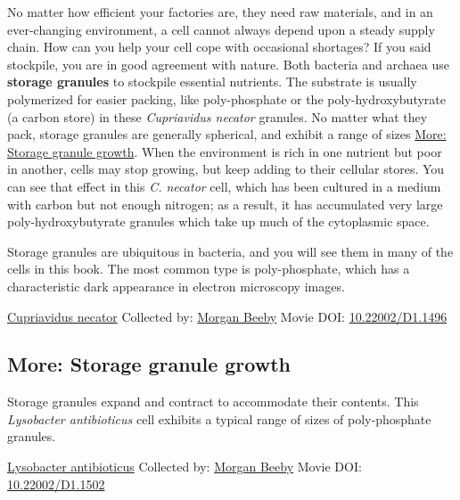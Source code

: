 \documentclass[]{tufte-book}
\begin{document}
No matter how efficient your factories are, they need raw materials, and in an ever-changing environment, a cell cannot always depend upon a steady supply chain. How can you help your cell cope with occasional shortages? If you said stockpile, you are in good agreement with nature. Both bacteria and archaea use \textbf{storage granules} to stockpile essential nutrients. The substrate is usually polymerized for easier packing, like poly-phosphate or the poly-hydroxybutyrate (a carbon store) in these \emph{Cupriavidus necator} granules. No matter what they pack, storage granules are generally spherical, and exhibit a range of sizes \protect\hyperlink{Storage_granule_growth}{More: Storage granule growth}. When the environment is rich in one nutrient but poor in another, cells may stop growing, but keep adding to their cellular stores. You can see that effect in this \emph{C. necator} cell, which has been cultured in a medium with carbon but not enough nitrogen; as a result, it has accumulated very large poly-hydroxybutyrate granules which take up much of the cytoplasmic space.

Storage granules are ubiquitous in bacteria, and you will see them in many of the cells in this book. The most common type is poly-phosphate, which has a characteristic dark appearance in electron microscopy images.



\hypertarget{htmlwidget-5c4355af012999587694}{}

\label{fig:4-8}\protect\hyperlink{tree}{Cupriavidus necator} Collected by: \protect\hyperlink{morgan_beeby}{Morgan Beeby} Movie DOI: \href{https://doi.org/10.22002/D1.1496}{10.22002/D1.1496}

\hypertarget{Storage_granule_growth}{%
\subsection*{More: Storage granule growth}\label{Storage_granule_growth}}

Storage granules expand and contract to accommodate their contents. This \emph{Lysobacter antibioticus} cell exhibits a typical range of sizes of poly-phosphate granules.



\hypertarget{htmlwidget-f50524f0ec49e2f00c61}{}

\label{fig:4-8a}\protect\hyperlink{tree}{Lysobacter antibioticus} Collected by: \protect\hyperlink{morgan_beeby}{Morgan Beeby} Movie DOI: \href{https://doi.org/10.22002/D1.1502}{10.22002/D1.1502}
\end{document}
